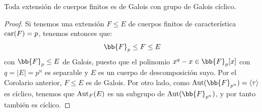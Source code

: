 \begin{coro}\label{coro:extensiones_de_cuerpos_finitos}
    Toda extensión de cuerpos finitos es de Galois con grupo de Galois cíclico.
    \begin{proof}
        Si tenemos una extensión $F\leq E$ de cuerpos finitos de característica $\operatorname{car}(F)=p$, tenemos entonces que:
        \begin{equation*}
            \bb{F}_p\leq F \leq E
        \end{equation*}
        con $\bb{F}_p\leq E$ de Galois, puesto que el polinomio $x^q-x \in \bb{F}_p[x]$ con $q=|E| = p^n$ es separable y $E$ es un cuerpo de descomposición suyo. Por el Corolario anterior, $F\leq E$ es de Galois. Por otro lado, como $\Aut(\bb{F}_{p^n}) = \langle \tau \rangle$ es cíclico, tenemos que $\operatorname{Aut}_F(E)$ es un subgrupo de $\Aut(\bb{F}_{p^n})$, y por tanto también es cíclico.
    \end{proof}
\end{coro}


